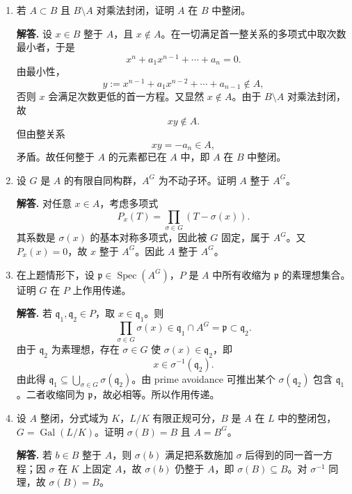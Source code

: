 \documentclass[a4paper]{ctexart}
\begin{document}
\begin{enumerate}[leftmargin=*, label=\textbf{5.\arabic*.}]
\begin{enumerate}[label=(\roman*)]
反过来若 \(a\in J(A)\)，对任意极大理想 \(n\subset B\)，其收缩 \(m=n\cap A\) 极大，故 \(a\in m\subset n\)。于是 \(a\in J(B)\)。
\end{enumerate}

\setcounter{enumi}{6}
\item 若 \(A\subset B\) 且 \(B\setminus A\) 对乘法封闭，证明 \(A\) 在 \(B\) 中整闭。

\textbf{解答.}
设 \(x\in B\) 整于 \(A\)，且 \(x\notin A\)。在一切满足首一整关系的多项式中取次数最小者，于是
\[
x^n+a_1x^{n-1}+\cdots+a_n=0.
\]
由最小性，
\[
y:=x^{n-1}+a_1x^{n-2}+\cdots+a_{n-1}\notin A,
\]
否则 \(x\) 会满足次数更低的首一方程。又显然 \(x\notin A\)。由于 \(B\setminus A\) 对乘法封闭，故
\[
xy\notin A.
\]
但由整关系
\[
xy=-a_n\in A,
\]
矛盾。故任何整于 \(A\) 的元素都已在 \(A\) 中，即 \(A\) 在 \(B\) 中整闭。

\setcounter{enumi}{11}
\item 设 \(G\) 是 \(A\) 的有限自同构群，\(A^G\) 为不动子环。证明 \(A\) 整于 \(A^G\)。

\textbf{解答.}
对任意 \(x\in A\)，考虑多项式
\[
P_x(T)=\prod_{\sigma\in G}(T-\sigma(x)).
\]
其系数是 \(\sigma(x)\) 的基本对称多项式，因此被 \(G\) 固定，属于 \(A^G\)。又 \(P_x(x)=0\)，故 \(x\) 整于 \(A^G\)。因此 \(A\) 整于 \(A^G\)。

\setcounter{enumi}{12}
\item 在上题情形下，设 \(\mathfrak p\in \operatorname{Spec}(A^G)\)，\(P\) 是 \(A\) 中所有收缩为 \(\mathfrak p\) 的素理想集合。证明 \(G\) 在 \(P\) 上作用传递。

\textbf{解答.}
若 \(\mathfrak q_1,\mathfrak q_2\in P\)，取 \(x\in \mathfrak q_1\)。则
\[
\prod_{\sigma\in G}\sigma(x)\in \mathfrak q_1\cap A^G=\mathfrak p\subset \mathfrak q_2.
\]
由于 \(\mathfrak q_2\) 为素理想，存在 \(\sigma\in G\) 使 \(\sigma(x)\in \mathfrak q_2\)，即
\[
x\in \sigma^{-1}(\mathfrak q_2).
\]
由此得 \(\mathfrak q_1\subseteq \bigcup_{\sigma\in G}\sigma(\mathfrak q_2)\)。由 prime avoidance 可推出某个 \(\sigma(\mathfrak q_2)\) 包含 \(\mathfrak q_1\)。二者收缩同为 \(\mathfrak p\)，故必相等。所以作用传递。

\setcounter{enumi}{13}
\item 设 \(A\) 整闭，分式域为 \(K\)，\(L/K\) 有限正规可分，\(B\) 是 \(A\) 在 \(L\) 中的整闭包，\(G=\operatorname{Gal}(L/K)\)。证明 \(\sigma(B)=B\) 且 \(A=B^G\)。

\textbf{解答.}
若 \(b\in B\) 整于 \(A\)，则 \(\sigma(b)\) 满足把系数施加 \(\sigma\) 后得到的同一首一方程；因 \(\sigma\) 在 \(K\) 上固定 \(A\)，故 \(\sigma(b)\) 仍整于 \(A\)，即 \(\sigma(B)\subseteq B\)。对 \(\sigma^{-1}\) 同理，故 \(\sigma(B)=B\)。


\end{enumerate}
\end{document}
